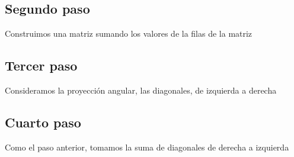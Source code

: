 \begin{enumerate}[1.]
\subsection{Segundo paso}
Construimos una matriz  sumando los valores de la filas de la matriz 

  \subsection{Tercer paso}
Consideramos la proyección angular, las diagonales, de izquierda a derecha


\subsection{Cuarto paso}
Como el paso anterior, tomamos la suma de diagonales de derecha a izquierda

\pagebreak


\end{enumerate}
